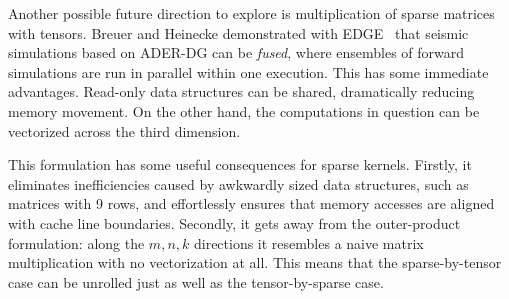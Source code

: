 Another possible future direction to explore is multiplication of sparse matrices with tensors. Breuer and Heinecke demonstrated with EDGE~\cite{10.1007/978-3-319-58667-0_3} that seismic simulations based on ADER-DG can be \emph{fused}, where ensembles of forward simulations are run in parallel within one execution. This has some immediate advantages. Read-only data structures can be shared, dramatically reducing memory movement. On the other hand, the computations in question can be vectorized across the third dimension.

This formulation has some useful consequences for sparse kernels. Firstly, it eliminates inefficiencies caused by awkwardly sized data structures, such as matrices with 9 rows, and effortlessly ensures that memory accesses are aligned with cache line boundaries. Secondly, it gets away from the outer-product formulation: along the $m,n,k$ directions it resembles a naive matrix multiplication with no vectorization at all. This means that the sparse-by-tensor case can be unrolled just as well as the tensor-by-sparse case. 




